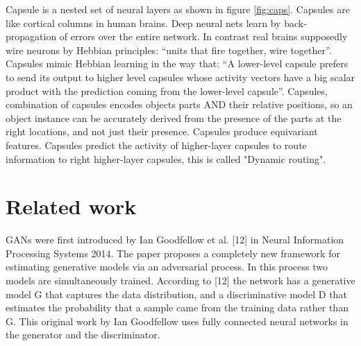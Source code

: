 \documentclass{vldb}
\begin{document}
Capsule is a nested set of neural layers as shown in figure \ref{fig:caps}. Capsules are like cortical columns in human brains. Deep neural nets learn by back-propagation of errors over the entire network. In contrast real brains supposedly wire neurons by Hebbian principles: “units that fire together, wire together”. Capsules mimic Hebbian learning in the way that: “A lower-level capsule prefers to send its output to higher level capsules whose activity vectors have a big scalar product with the prediction coming from the lower-level capsule”. Capsules, combination of capsules encodes objects parts AND their relative positions, so an object instance can be accurately derived from the presence of the parts at the right locations, and not just their presence. Capsules produce equivariant features. Capsules predict the activity of higher-layer capsules to route information to right higher-layer capsules, this is called "Dynamic routing".


\section{Related work}
GANs were first introduced by Ian Goodfellow et al. [12] in Neural Information
Processing Systems 2014. The paper proposes a completely new framework for estimating
generative models via an adversarial process. In this process two models are
simultaneously trained. According to [12] the network has a generative model G that
captures the data distribution, and a discriminative model D that estimates the probability
that a sample came from the training data rather than G. This original work
by Ian Goodfellow uses fully connected neural networks in the generator and the discriminator.
\end{document}
